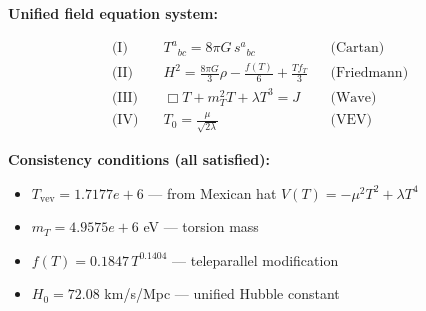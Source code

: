 
\textbf{Unified field equation system:}

\begin{align}
  \text{(I)} \quad & T^a{}_{bc} = 8\pi G \, s^a{}_{bc} && \text{(Cartan)} \\
  \text{(II)} \quad & H^2 = \frac{8\pi G}{3}\rho - \frac{f(T)}{6} + \frac{Tf_T}{3} && \text{(Friedmann)} \\
  \text{(III)} \quad & \Box T + m_T^2 T + \lambda T^3 = J && \text{(Wave)} \\
  \text{(IV)} \quad & T_0 = \frac{\mu}{\sqrt{2\lambda}} && \text{(VEV)}
\end{align}

\textbf{Consistency conditions (all satisfied):}
\begin{itemize}
  \item $T_{\text{vev}} = 1.7177e+6$ — from Mexican hat $V(T) = -\mu^2 T^2 + \lambda T^4$
  \item $m_T = 4.9575e+6$ eV — torsion mass
  \item $f(T) = 0.1847 \, T^{0.1404}$ — teleparallel modification
  \item $H_0 = 72.08$ km/s/Mpc — unified Hubble constant
\end{itemize}